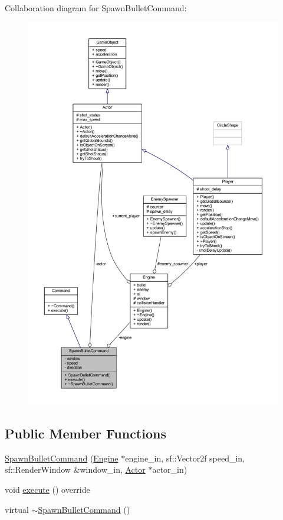 Collaboration diagram for Spawn\+Bullet\+Command\+:\nopagebreak
\begin{figure}[H]
\begin{center}
\leavevmode
\includegraphics[width=350pt]{class_spawn_bullet_command__coll__graph}
\end{center}
\end{figure}
\subsection*{Public Member Functions}
\begin{DoxyCompactItemize}
\item 
\hyperlink{class_spawn_bullet_command_afb9ba5b912fcd791bf294433f0888b25}{Spawn\+Bullet\+Command} (\hyperlink{class_engine}{Engine} $\ast$engine\+\_\+in, sf\+::\+Vector2f speed\+\_\+in, sf\+::\+Render\+Window \&window\+\_\+in, \hyperlink{class_actor}{Actor} $\ast$actor\+\_\+in)
\item 
void \hyperlink{class_spawn_bullet_command_a558af584b91637cd6bcf989d799eca4d}{execute} () override
\item 
virtual \hyperlink{class_spawn_bullet_command_ac22b1ce86d8ae1d7fb1df78745cb4db6}{$\sim$\+Spawn\+Bullet\+Command} ()
\end{DoxyCompactItemize}
